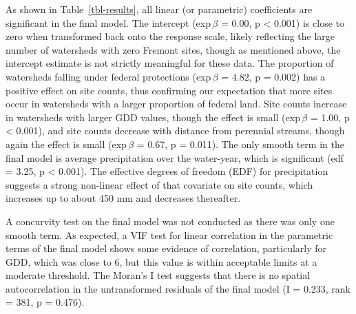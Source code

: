 \documentclass[
  number,
  preprint,
  3p]{elsarticle}
\begin{document}
As shown in Table~\ref{tbl-results}, all linear (or parametric)
coefficients are significant in the final model. The intercept
(exp\(\,\beta\) = 0.00, p \textless{} 0.001) is close to zero when
transformed back onto the response scale, likely reflecting the large
number of watersheds with zero Fremont sites, though as mentioned above,
the intercept estimate is not strictly meaningful for these data. The
proportion of watersheds falling under federal protections
(exp\(\,\beta\) = 4.82, p = 0.002) has a positive effect on site counts,
thus confirming our expectation that more sites occur in watersheds with
a larger proportion of federal land. Site counts increase in watersheds
with larger GDD values, though the effect is small (exp\(\,\beta\) =
1.00, p \textless{} 0.001), and site counts decrease with distance from
perennial streams, though again the effect is small (exp\(\,\beta\) =
0.67, p = 0.011). The only smooth term in the final model is average
precipitation over the water-year, which is significant (edf = 3.25, p
\textless{} 0.001). The effective degrees of freedom (EDF) for
precipitation suggests a strong non-linear effect of that covariate on
site counts, which increases up to about 450 mm and decreases
thereafter.

A concurvity test on the final model was not conducted as there was only
one smooth term. As expected, a VIF test for linear correlation in the
parametric terms of the final model shows some evidence of correlation,
particularly for GDD, which was close to 6, but this value is within
acceptable limits at a moderate threshold. The Moran's I test suggests
that there is no spatial autocorrelation in the untransformed residuals
of the final model (I = 0.233, rank = 381, p = 0.476).
\end{document}
